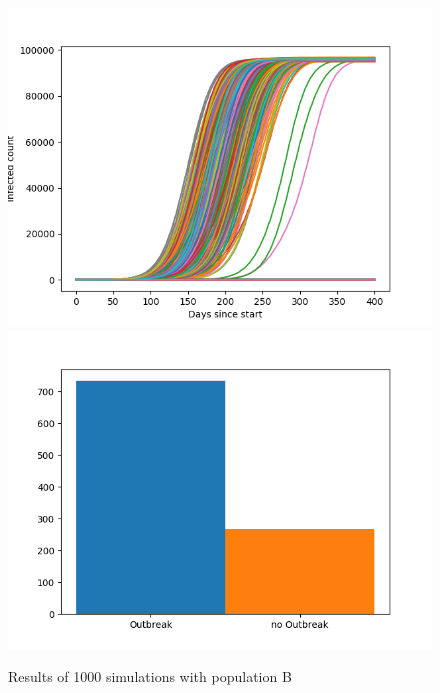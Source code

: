 \documentclass[runningheads]{llncs}
\begin{document}
	\begin{figure}
		\includegraphics[width=\textwidth]{outbreaks_populationB.png}
		\includegraphics[width=\textwidth]{barchart_populationB.png}
		\caption{Results of 1000 simulations with population B}
	\end{figure}
	\newpage
	\noindent
\end{document}
